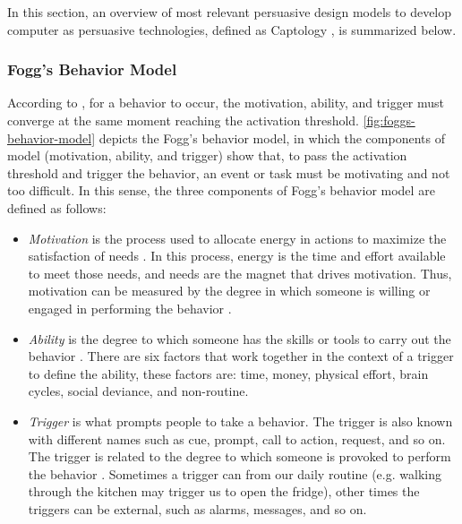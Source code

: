 In this section, an overview of most relevant persuasive design models to develop computer as persuasive technologies, defined as Captology \cite{Fogg2002}, is summarized below.

\subsubsection{Fogg's Behavior Model}
\label{subsubsec:fogg-behavior-model}

According to , for a behavior to occur, the motivation, ability, and trigger must converge at the same moment reaching the activation threshold. \autoref{fig:foggs-behavior-model} depicts the Fogg's behavior model, in which the components of model (motivation, ability, and trigger) show that, to pass the activation threshold and trigger the behavior, an event or task must be motivating and not too difficult. In this sense, the three components of Fogg's behavior model are defined as follows:

\begin{itemize}
\item \emph{Motivation} is the process used to allocate energy in actions to maximize the satisfaction of needs \cite{PritchardAshwood2008}. In this process, energy is the time and effort available to meet those needs, and needs are the magnet that drives motivation. Thus, motivation can be measured by the degree in which someone is willing or engaged in performing the behavior \cite{Xu2011}.
\item \emph{Ability} is the degree to which someone has the skills or tools to carry out the behavior \cite{Xu2011}. There are six factors that work together in the context of a trigger to define the ability, these factors are: time, money, physical effort, brain cycles, social deviance, and non-routine.
\item \emph{Trigger} is what prompts people to take a behavior. The trigger is also known with different names such as cue, prompt, call to action, request, and so on. The trigger is related to the degree to which someone is provoked to perform the behavior \cite{Xu2011}. Sometimes a trigger can from our daily routine (e.g. walking through the kitchen may trigger us to open the fridge), other times the triggers can be external, such as alarms, messages, and so on.
\end{itemize}

